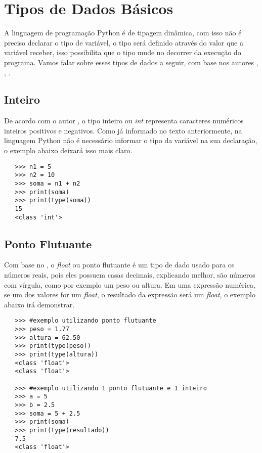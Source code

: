     \section{Tipos de Dados Básicos}
	A linguagem de programação Python é de tipagem dinâmica, com isso não é preciso declarar o tipo de variável, o tipo será definido através do valor que a variável receber, isso possibilita que o tipo mude no decorrer da execução do programa. Vamos falar sobre esses tipos de dados a seguir, com base nos autores \cite{Lutz2007}, \cite{Perkovic2016}, \cite{Severance2016}.
	
			\subsection{Inteiro}
			De acordo com o autor \cite{Perkovic2016}, o tipo inteiro ou \textit{int} representa caracteres numéricos inteiros positivos e negativos. Como já informado no texto anteriormente, na linguagem Python não é necessário informar o tipo da variável na sua declaração, o exemplo abaixo deixará isso mais claro.
			\begin{lstlisting}
   >>> n1 = 5
   >>> n2 = 10
   >>> soma = n1 + n2
   >>> print(soma)	
   >>> print(type(soma))		
   15
   <class 'int'>
			\end{lstlisting}
		
			\subsection{Ponto Flutuante}
			Com base no \cite{Perkovic2016}, o \textit{float} ou ponto flutuante é um tipo de dado usado para os números reais, pois eles possuem casas decimais, explicando melhor, são números com vírgula, como por exemplo um peso ou altura. Em uma expressão numérica, se um dos valores for um \textit{float}, o resultado da expressão será um \textit{float}, o exemplo abaixo irá demonstrar.
			\begin{lstlisting}
   >>> #exemplo utilizando ponto flutuante
   >>> peso = 1.77
   >>> altura = 62.50
   >>> print(type(peso))
   >>> print(type(altura))
   <class 'float'>
   <class 'float'>
   
   >>> #exemplo utilizando 1 ponto flutuante e 1 inteiro
   >>> a = 5
   >>> b = 2.5
   >>> soma = 5 + 2.5
   >>> print(soma)
   >>> print(type(resultado))
   7.5
   <class 'float'>
			\end{lstlisting}
		

